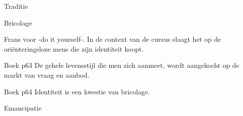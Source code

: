 \documentclass[main.tex]{subfiles}
\begin{document}
\begin{examenvraag}
    \begin{vraag}
        Traditie
    \end{vraag}

    \begin{antwoord}
    \end{antwoord}
\end{examenvraag}

\begin{examenvraag}
    \begin{vraag}
        Bricolage
    \end{vraag}

    \begin{antwoord}
		Frans voor -do it yourself-. In de context van de cursus slaagt het op de ori\"{e}nteringsloze mens die zijn identiteit koopt. 
		  \begin{citaat}{Boek p63}
		De gehele levensstijl die men zich aanmeet, wordt aangekocht op de markt van vraag en aanbod.
        \end{citaat}
       \begin{citaat}{Boek p64}
		Identiteit is een kwestie van bricolage.
        \end{citaat}
    \end{antwoord}
   
\end{examenvraag}

\begin{examenvraag}
    \begin{vraag}
        Emancipatie
    \end{vraag}

    \begin{antwoord}
    \end{antwoord}
\end{examenvraag}
\end{document}
